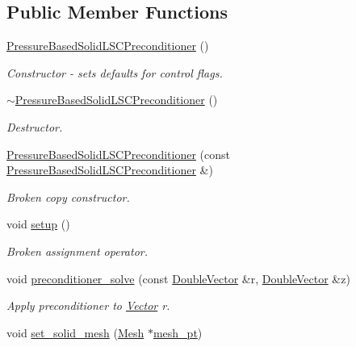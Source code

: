 \subsection*{Public Member Functions}
\begin{DoxyCompactItemize}
\item 
\hyperlink{classoomph_1_1PressureBasedSolidLSCPreconditioner_a31b7034fb267b830594671d06b86f01a}{Pressure\+Based\+Solid\+L\+S\+C\+Preconditioner} ()
\begin{DoxyCompactList}\small\item\em Constructor -\/ sets defaults for control flags. \end{DoxyCompactList}\item 
\hyperlink{classoomph_1_1PressureBasedSolidLSCPreconditioner_a2ed209babe751dcd64085d75b5ab9593}{$\sim$\+Pressure\+Based\+Solid\+L\+S\+C\+Preconditioner} ()
\begin{DoxyCompactList}\small\item\em Destructor. \end{DoxyCompactList}\item 
\hyperlink{classoomph_1_1PressureBasedSolidLSCPreconditioner_a29d5b33a278a9ac3d868646553db949a}{Pressure\+Based\+Solid\+L\+S\+C\+Preconditioner} (const \hyperlink{classoomph_1_1PressureBasedSolidLSCPreconditioner}{Pressure\+Based\+Solid\+L\+S\+C\+Preconditioner} \&)
\begin{DoxyCompactList}\small\item\em Broken copy constructor. \end{DoxyCompactList}\item 
void \hyperlink{classoomph_1_1PressureBasedSolidLSCPreconditioner_aba594f38c2d36775115adbc90bcd0025}{setup} ()
\begin{DoxyCompactList}\small\item\em Broken assignment operator. \end{DoxyCompactList}\item 
void \hyperlink{classoomph_1_1PressureBasedSolidLSCPreconditioner_ab81479f6e6a91ecb048f8c8d7e050744}{preconditioner\+\_\+solve} (const \hyperlink{classoomph_1_1DoubleVector}{Double\+Vector} \&r, \hyperlink{classoomph_1_1DoubleVector}{Double\+Vector} \&z)
\begin{DoxyCompactList}\small\item\em Apply preconditioner to \hyperlink{classoomph_1_1Vector}{Vector} r. \end{DoxyCompactList}\item 
void \hyperlink{classoomph_1_1PressureBasedSolidLSCPreconditioner_ad432b40acc45b0f8f065c96154f64240}{set\+\_\+solid\+\_\+mesh} (\hyperlink{classoomph_1_1Mesh}{Mesh} $\ast$\hyperlink{classoomph_1_1BlockPreconditioner_a3c0e92cb77c3e3179007fe9fd99b6428}{mesh\+\_\+pt})

\end{DoxyCompactItemize}
